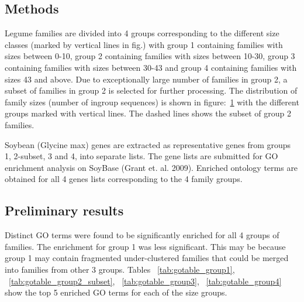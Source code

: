\documentclass{article}
\begin{document}
		\subsection{Methods}
		Legume families are divided into 4 groups corresponding to the different size classes (marked by vertical lines in fig.) with group 1 containing families with sizes between 0-10, group 2 containing families with sizes between 10-30, group 3 containing families with sizes between 30-43 and group 4 containing families with sizes 43 and above. Due to exceptionally large number of families in group 2, a subset of families in group 2 is selected for further processing. The distribution of family sizes (number of ingroup sequences) is shown in figure:~\ref{fig:hist_lgf5_family_size_groups} with the different groups marked with vertical lines. The dashed lines shows the subset of group 2 families.
		
		\begin{figure}[h!]
			\caption{}
			\label{fig:hist_lgf5_family_size_groups}
		\end{figure}
	
		Soybean (Glycine max) genes are extracted as representative genes from groups 1, 2-subset, 3 and 4, into separate lists. The gene lists are submitted for GO enrichment analysis on SoyBase (Grant et. al. 2009). Enriched ontology terms are obtained for all 4 genes lists corresponding to the 4 family groups.
		
		\subsection{Preliminary results}
		Distinct GO terms were found to be significantly enriched for all 4 groups of families. The enrichment for group 1 was less significant. This may be because group 1 may contain fragmented under-clustered families that could be merged into families from other 3 groups. Tables ~\ref{tab:gotable_group1}, ~\ref{tab:gotable_group2_subset}, ~\ref{tab:gotable_group3}, ~\ref{tab:gotable_group4} show the top 5 enriched GO terms for each of the size groups.
		
\end{document}
